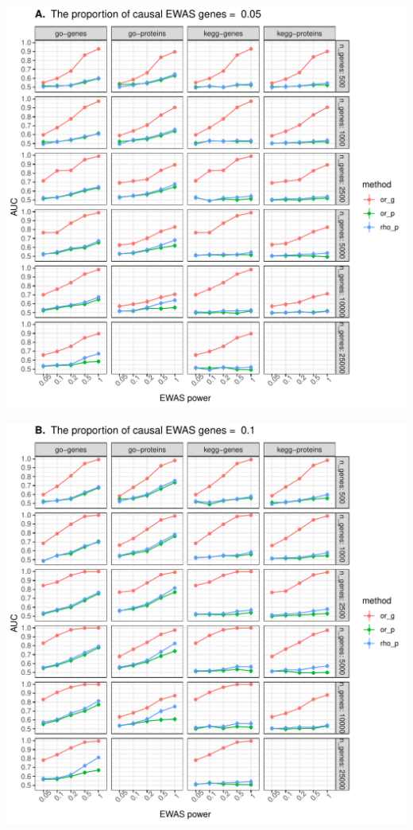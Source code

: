 \documentclass[11pt,twoside]{bristolthesis}
\begin{document}
\begin{center}\includegraphics[width=1\linewidth]{figure/06-ewas_gwas_comparison/method_test_gene_v_protein/PEC_0.05} \end{center}
\begin{center}\includegraphics[width=1\linewidth]{figure/06-ewas_gwas_comparison/method_test_gene_v_protein/PEC_0.1} \end{center}
\end{document}
